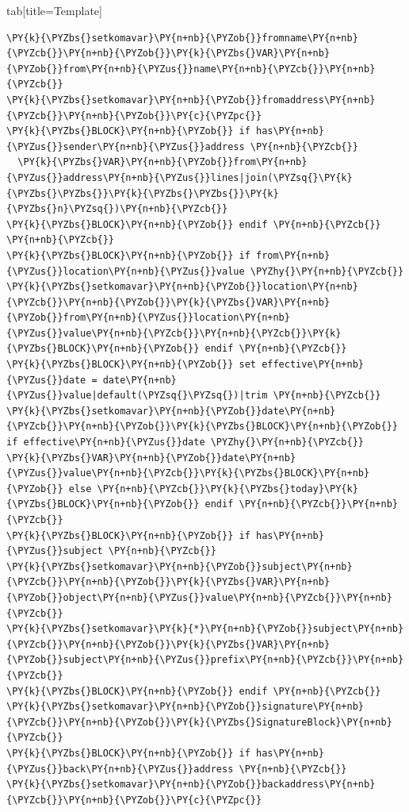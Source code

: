 \documentclass[a4paper,twoside]{article}
\begin{document}
\begin{tsdiv}{tab}[title=Template]
\begin{tscode}[lang=latex, engine=pygments]
\begin{Verbatim}[commandchars=\\\{\},breaklines, breakanywhere, commandchars=\\\{\}]
\PY{k}{\PYZbs{}setkomavar}\PY{n+nb}{\PYZob{}}fromname\PY{n+nb}{\PYZcb{}}\PY{n+nb}{\PYZob{}}\PY{k}{\PYZbs{}VAR}\PY{n+nb}{\PYZob{}}from\PY{n+nb}{\PYZus{}}name\PY{n+nb}{\PYZcb{}}\PY{n+nb}{\PYZcb{}}
\PY{k}{\PYZbs{}setkomavar}\PY{n+nb}{\PYZob{}}fromaddress\PY{n+nb}{\PYZcb{}}\PY{n+nb}{\PYZob{}}\PY{c}{\PYZpc{}}
\PY{k}{\PYZbs{}BLOCK}\PY{n+nb}{\PYZob{}} if has\PY{n+nb}{\PYZus{}}sender\PY{n+nb}{\PYZus{}}address \PY{n+nb}{\PYZcb{}}
  \PY{k}{\PYZbs{}VAR}\PY{n+nb}{\PYZob{}}from\PY{n+nb}{\PYZus{}}address\PY{n+nb}{\PYZus{}}lines|join(\PYZsq{}\PY{k}{\PYZbs{}\PYZbs{}}\PY{k}{\PYZbs{}\PYZbs{}}\PY{k}{\PYZbs{}n}\PYZsq{})\PY{n+nb}{\PYZcb{}}
\PY{k}{\PYZbs{}BLOCK}\PY{n+nb}{\PYZob{}} endif \PY{n+nb}{\PYZcb{}}
\PY{n+nb}{\PYZcb{}}
\PY{k}{\PYZbs{}BLOCK}\PY{n+nb}{\PYZob{}} if from\PY{n+nb}{\PYZus{}}location\PY{n+nb}{\PYZus{}}value \PYZhy{}\PY{n+nb}{\PYZcb{}}
\PY{k}{\PYZbs{}setkomavar}\PY{n+nb}{\PYZob{}}location\PY{n+nb}{\PYZcb{}}\PY{n+nb}{\PYZob{}}\PY{k}{\PYZbs{}VAR}\PY{n+nb}{\PYZob{}}from\PY{n+nb}{\PYZus{}}location\PY{n+nb}{\PYZus{}}value\PY{n+nb}{\PYZcb{}}\PY{n+nb}{\PYZcb{}}\PY{k}{\PYZbs{}BLOCK}\PY{n+nb}{\PYZob{}} endif \PY{n+nb}{\PYZcb{}}
\PY{k}{\PYZbs{}BLOCK}\PY{n+nb}{\PYZob{}} set effective\PY{n+nb}{\PYZus{}}date = date\PY{n+nb}{\PYZus{}}value|default(\PYZsq{}\PYZsq{})|trim \PY{n+nb}{\PYZcb{}}
\PY{k}{\PYZbs{}setkomavar}\PY{n+nb}{\PYZob{}}date\PY{n+nb}{\PYZcb{}}\PY{n+nb}{\PYZob{}}\PY{k}{\PYZbs{}BLOCK}\PY{n+nb}{\PYZob{}} if effective\PY{n+nb}{\PYZus{}}date \PYZhy{}\PY{n+nb}{\PYZcb{}}
\PY{k}{\PYZbs{}VAR}\PY{n+nb}{\PYZob{}}date\PY{n+nb}{\PYZus{}}value\PY{n+nb}{\PYZcb{}}\PY{k}{\PYZbs{}BLOCK}\PY{n+nb}{\PYZob{}} else \PY{n+nb}{\PYZcb{}}\PY{k}{\PYZbs{}today}\PY{k}{\PYZbs{}BLOCK}\PY{n+nb}{\PYZob{}} endif \PY{n+nb}{\PYZcb{}}\PY{n+nb}{\PYZcb{}}
\PY{k}{\PYZbs{}BLOCK}\PY{n+nb}{\PYZob{}} if has\PY{n+nb}{\PYZus{}}subject \PY{n+nb}{\PYZcb{}}
\PY{k}{\PYZbs{}setkomavar}\PY{n+nb}{\PYZob{}}subject\PY{n+nb}{\PYZcb{}}\PY{n+nb}{\PYZob{}}\PY{k}{\PYZbs{}VAR}\PY{n+nb}{\PYZob{}}object\PY{n+nb}{\PYZus{}}value\PY{n+nb}{\PYZcb{}}\PY{n+nb}{\PYZcb{}}
\PY{k}{\PYZbs{}setkomavar}\PY{k}{*}\PY{n+nb}{\PYZob{}}subject\PY{n+nb}{\PYZcb{}}\PY{n+nb}{\PYZob{}}\PY{k}{\PYZbs{}VAR}\PY{n+nb}{\PYZob{}}subject\PY{n+nb}{\PYZus{}}prefix\PY{n+nb}{\PYZcb{}}\PY{n+nb}{\PYZcb{}}
\PY{k}{\PYZbs{}BLOCK}\PY{n+nb}{\PYZob{}} endif \PY{n+nb}{\PYZcb{}}
\PY{k}{\PYZbs{}setkomavar}\PY{n+nb}{\PYZob{}}signature\PY{n+nb}{\PYZcb{}}\PY{n+nb}{\PYZob{}}\PY{k}{\PYZbs{}SignatureBlock}\PY{n+nb}{\PYZcb{}}
\PY{k}{\PYZbs{}BLOCK}\PY{n+nb}{\PYZob{}} if has\PY{n+nb}{\PYZus{}}back\PY{n+nb}{\PYZus{}}address \PY{n+nb}{\PYZcb{}}
\PY{k}{\PYZbs{}setkomavar}\PY{n+nb}{\PYZob{}}backaddress\PY{n+nb}{\PYZcb{}}\PY{n+nb}{\PYZob{}}\PY{c}{\PYZpc{}}

\end{Verbatim}
\end{tscode}
\end{tsdiv}
\end{document}
